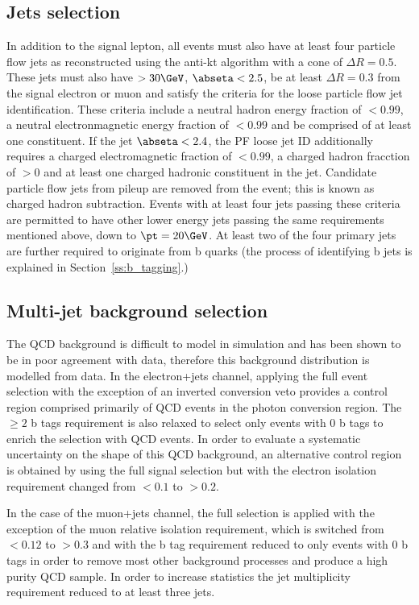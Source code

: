 \subsection{Jets selection}
\label{jets_selection}
In addition to the signal lepton, all events must also have at least four particle flow jets as reconstructed
using the anti-kt algorithm \cite{Cacciari:2008gp} with a cone of $\Delta R = 0.5$. These jets must also have
\pt $> 30\GeV$, $\abseta < 2.5$, be at least $\Delta R = 0.3$ from the signal electron or muon and satisfy the
criteria for the loose particle flow jet identification. These criteria include a neutral hadron energy
fraction of $<0.99$, a neutral electronmagnetic energy fraction of $<0.99$ and be comprised of at least one
constituent. If the jet $\abseta < 2.4$, the PF loose jet ID additionally requires a charged electromagnetic
fraction of $<0.99$, a charged hadron fracction of $> 0$ and at least one charged hadronic constituent in the
jet. Candidate particle flow jets from pileup are removed from the event; this is known as charged hadron
subtraction. Events with at least four jets passing these criteria are permitted to have other lower energy
jets passing the same requirements mentioned above, down to $\pt = 20\GeV$. At least two of the four primary
jets are further required to originate from b quarks (the process of identifying b jets is explained in
Section~\ref{ss:b_tagging}.)

\subsection{Multi-jet background selection}
\label{ss:background_selection}
The QCD background is difficult to model in simulation and has been shown to be in poor agreement with data,
therefore this background distribution is modelled from data. In the electron+jets channel, applying the full
event selection with the exception of an inverted conversion veto provides a control region comprised
primarily of QCD events in the photon conversion region. The $\geq 2$ b tags requirement is also
relaxed to select only events with 0 b tags to enrich the selection with QCD events.
In order to evaluate a systematic uncertainty on the shape of this QCD background, an alternative control region
is obtained by using the full signal selection but with the electron isolation requirement changed from $<
0.1$ to $> 0.2$.

In the case of the muon+jets channel, the full selection is applied with the exception of the muon relative
isolation requirement, which is switched from $< 0.12$ to $> 0.3$ and with the b tag requirement reduced to
only events with 0 b tags in order to remove most other \ttbar background processes and produce a high purity
QCD sample. In order to increase statistics the jet multiplicity requirement reduced to at least three jets.

